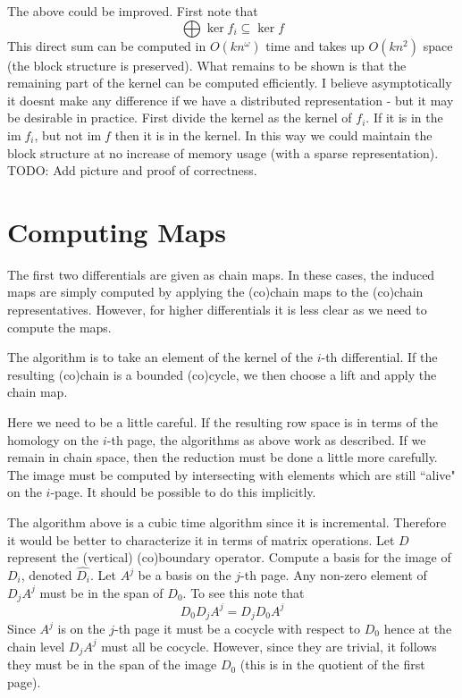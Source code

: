 \documentclass{amsart}
\newcommand{\im}{\mathrm{im\;}}
\begin{document}
The above could be improved. 	
First note that 
	$$ \bigoplus \ker f_i \subseteq \ker f $$
	This direct sum can be computed in $O(kn^\omega)$ time and takes  up $O(kn^2)$ space (the block structure is preserved). What remains to be shown is that the remaining part of the kernel can be computed efficiently. I believe asymptotically it doesnt make any difference if we have a distributed representation - but it may be desirable in practice. First divide the kernel as the kernel of $f_i$. If it is in the  $\im f_i$, but not $\im f$ then it is in the kernel. In this way we could maintain the block structure at no increase of memory usage (with a sparse representation). TODO: Add picture and proof of correctness.
	

\section{Computing Maps}

The first two differentials are given as chain maps. In these cases, the induced maps are simply computed by applying the (co)chain maps to the (co)chain representatives. 
However, for higher differentials it is less clear as we need to compute the maps.

The algorithm is to take an element of the kernel of the $i$-th differential. If the resulting (co)chain is a bounded (co)cycle, we then choose a lift and apply the chain map. 

Here we need to be a little careful. If the resulting row space is in terms of the homology on the $i$-th page, the algorithms as above work as described. If we remain in chain space, then the reduction must be done a little more carefully.  The image must be computed by intersecting with elements which are still ``alive" on the $i$-page. It should be possible to do this implicitly. 

The algorithm above is a cubic time algorithm since it is incremental. Therefore it would be better to characterize it in terms of matrix operations. Let $D$ represent the (vertical) (co)boundary operator. Compute a basis
for the image of $D_i$, denoted $\hat{D_i}$.  Let $A^{j}$  be a basis on  the $j$-th page. 
Any non-zero element of $D_j A^j$ must be in the span of $D_0$. To see this note that 
$$D_0 D_j A^j = D_j D_0 A^j$$   
Since $A^j$ is on the $j$-th page it must be a cocycle with respect to $D_0$ hence at the chain level $D_j A^j$ must all be cocycle. However, since they are trivial, it follows they must be in the span of the image $D_0$ (this is in the quotient of the first page). 	
\end{document}

